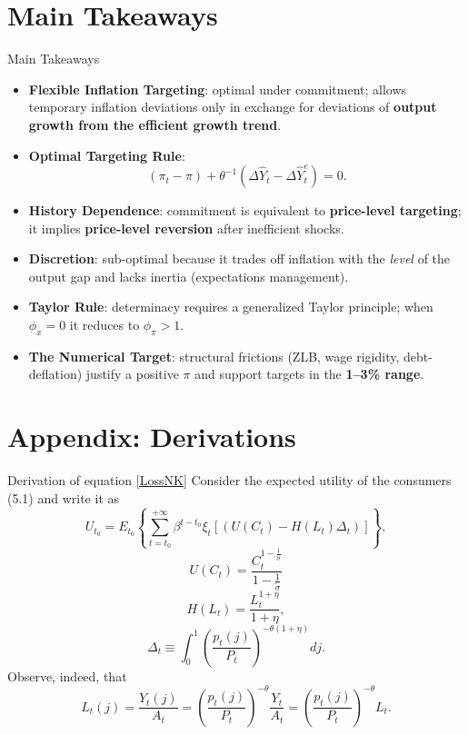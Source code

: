\documentclass[11pt,aspectratio=169]{beamer}
\begin{document}
\section{Main Takeaways}
\begin{frame}{Main Takeaways}
\small
\begin{itemize}
  \item \textbf{Flexible Inflation Targeting}: optimal under commitment; allows temporary inflation deviations only in exchange for deviations of \textbf{output growth from the efficient growth trend}.
  \item \textbf{Optimal Targeting Rule}:
  \[
  (\pi_t - \pi) + \theta^{-1}(\Delta \hat{Y}_t - \Delta \hat{Y}_t^e) = 0.
  \]
  \item \textbf{History Dependence}: commitment is equivalent to \textbf{price-level targeting}; it implies \textbf{price-level reversion} after inefficient shocks.
  \item \textbf{Discretion}: sub-optimal because it trades off inflation with the \emph{level} of the output gap and lacks inertia (expectations management).
  \item \textbf{Taylor Rule}: determinacy requires a generalized Taylor principle; when $\phi_x=0$ it reduces to $\phi_\pi>1$.
  \item \textbf{The Numerical Target}: structural frictions (ZLB, wage rigidity, debt-deflation) justify a positive $\pi$ and support targets in the \textbf{1--3\% range}.
\end{itemize}
\end{frame}


\appendix
\section{Appendix: Derivations}
\begin{frame}[label=Appendix F]{Derivation of equation \eqref{LossNK}}
\small
Consider the expected utility of the consumers (5.1) and write
it as%
\begin{equation*}
U_{t_{0}}=E_{t_{0}}\left\{ \sum_{t=t_{0}}^{+\infty }\beta ^{t-t_{0}}\xi _{t} 
\left[ \left( U(C_{t})-H(L_{t})\Delta _{t}\right) \right] \right\} ,
\end{equation*}%
\begin{equation*}
U(C_{t})=\frac{C_{t}^{1-\frac{1}{\tilde{\sigma}}}}{1-\frac{1}{\tilde{\sigma}}%
}
\end{equation*}%
\begin{equation*}
H(L_{t})=\frac{L_{t}^{1+\eta }}{1+\eta },
\end{equation*}%
\begin{equation*}
\Delta _{t}\equiv \int_{0}^{1}\left( \frac{p_{t}(j)}{P_{t}}\right) ^{-\theta
(1+\eta )}dj.
\end{equation*}%
Observe, indeed, that 
\begin{equation*}
L_{t}(j)=\frac{Y_{t}(j)}{A_{t}}=\left( \frac{p_{t}(j)}{P_{t}}\right)
^{-\theta }\frac{Y_{t}}{A_{t}}=\left( \frac{p_{t}(j)}{P_{t}}\right)
^{-\theta }L_{t}.
\end{equation*}%
\end{frame}
\end{document}
